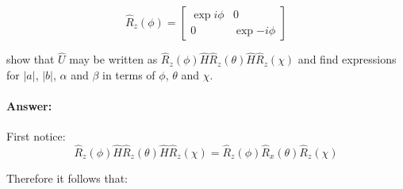 \documentclass[reprint, amsmath,amssymb, aps]{revtex4-2}
\begin{document}
                \begin{equation*}
                    \hat{R}_z(\phi) = \begin{bmatrix}\exp{i\phi}&0\\0&\exp{-i\phi}\end{bmatrix}
                \end{equation*}

                show that $\hat{U}$ may be written as $\hat{R}_z(\phi)\hat{H}\hat{R}_z(\theta)\hat{H}\hat{R}_z(\chi)$ and find expressions for $|a|$, $|b|$, $\alpha$ and $\beta$ in terms of $\phi$, $\theta$ and $\chi$.

                \begin{mdframed}
                    \paragraph{Answer:}

                    First notice:
                    \begin{equation*}
                        \hat{R}_z(\phi)\hat{H}\hat{R}_z(\theta)\hat{H}\hat{R}_z(\chi) = \hat{R}_z(\phi)\hat{R}_x(\theta)\hat{R}_z(\chi)
                    \end{equation*}

                    Therefore it follows that:


\end{mdframed}
\end{document}
